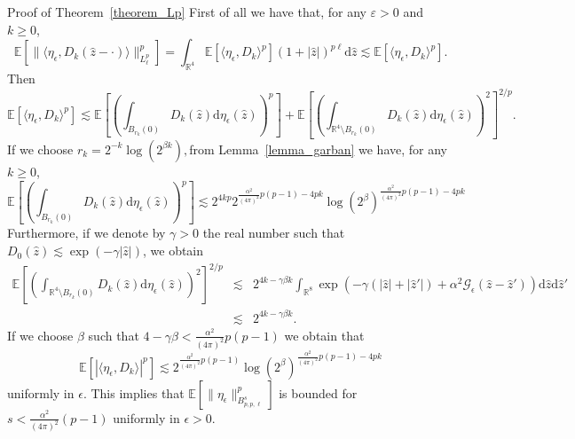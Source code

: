 \documentclass[a4paper,10pt]{article}
\newcommand{\mathd}{\mathrm{d}}
\newenvironment{proof*}[1]{\noindent\textbf{#1\ }}{\hspace*{\fill}$\Box$\medskip}
\begin{document}
\begin{proof*}{Proof of Theorem~\ref{theorem_Lp}}
  First of all we have that, for any $\varepsilon > 0$ and $k \geqslant 0$, \
  \
  \[ \mathbb{E} [\| \langle \eta_{\epsilon}, D_k (\hat{z} - \cdot) \rangle
     \|_{L^p_{\ell}}^p] = \int_{\mathbb{R}^4} \mathbb{E} [\langle
     \eta_{\epsilon}, D_k \rangle^p] (1 + | \hat{z} |)^{p \ell} \mathd \hat{z}
     \lesssim \mathbb{E} [\langle \eta_{\epsilon}, D_k \rangle^p] . \]
  Then
  \[ \mathbb{E} [\langle \eta_{\epsilon}, D_k \rangle^p] \lesssim \mathbb{E}
     \left[ \left( \int_{B_{r_k} (0)} D_k (\hat{z}) \mathd \eta_{\epsilon}
     (\hat{z}) \right)^p \right] +\mathbb{E} \left[ \left( \int_{\mathbb{R}^4
     \setminus B_{r_k} (0)} D_k (\hat{z}) \mathd \eta_{\epsilon} (\hat{z})
     \right)^2 \right]^{2 / p} . \]
  If we choose $r_k = 2^{- k} \log (2^{\beta k}),$from
  Lemma~\ref{lemma_garban} we have, for any $k \geqslant 0$, \
  \[ \mathbb{E} \left[ \left( \int_{B_{r_k} (0)} D_k (\hat{z}) \mathd
     \eta_{\epsilon} (\hat{z}) \right)^p \right] \lesssim 2^{4 k p}
     2^{\frac{\alpha^2}{(4 \pi)^2} p (p - 1) - 4 p k} \log
     (2^{\beta})^{\frac{\alpha^2}{(4 \pi)^2} p (p - 1) - 4 p k} \]
  Furthermore, if we denote by $\gamma > 0$ the real number such that $D_0
  (\hat{z}) \lesssim \exp (- \gamma | \hat{z} |)$, we obtain
  \[ \begin{array}{lll}
       \mathbb{E} \left[ \left( \int_{\mathbb{R}^4 \setminus B_{r_k} (0)} D_k
       (\hat{z}) \mathd \eta_{\epsilon} (\hat{z}) \right)^2 \right]^{2 / p} &
       \lesssim & 2^{4 k - \gamma \beta k} \int_{\mathbb{R}^8} \exp (- \gamma
       (| \hat{z} | + | \hat{z}' |) + \alpha^2 \mathcal{G}_{\epsilon} (\hat{z}
       - \hat{z}')) \mathd \hat{z} \mathd \hat{z}'\\
       & \lesssim & 2^{4 k - \gamma \beta k} .
     \end{array} \]
  If we choose $\beta$ such that $4 - \gamma \beta < \frac{\alpha^2}{(4
  \pi)^2} p (p - 1)$ we obtain that
  \begin{equation}
    \mathbb{E} [| \langle \eta_{\epsilon}, D_k \rangle |^p] \lesssim
    2^{\frac{\alpha^2}{(4 \pi)^2} p (p - 1)} \log
    (2^{\beta})^{\frac{\alpha^2}{(4 \pi)^2} p (p - 1) - 4 p k} \label{eq:Lp1}
  \end{equation}
  uniformly in $\epsilon$. This implies that $\mathbb{E} [\| \eta_{\epsilon}
  \|_{B^s_{p, p, \ell}}^p]$ is bounded for $s < \frac{\alpha^2}{(4 \pi)^2} (p
  - 1)$ uniformly in $\epsilon > 0$.
  

\end{proof*}
\end{document}
